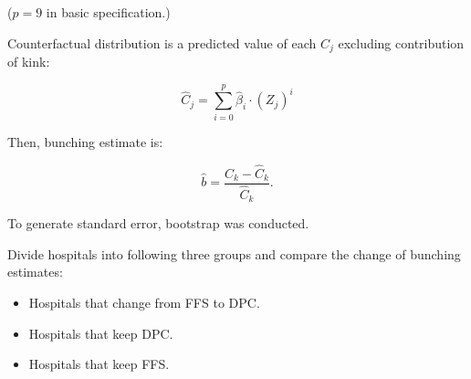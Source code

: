 \documentclass[14pt]{beamer}
\begin{document}
\begin{frame}[allowframebreaks]
{($p=9$ in basic specification.)
}

\framebreak

Counterfactual distribution is a predicted value of each $C_j$ excluding contribution of kink:

\begin{equation}
{\hat C_j}=\sum_{i=0}^p {\hat \beta_{i}}\cdot(Z_j)^i
\end{equation}

Then, bunching estimate is:

\begin{equation}
{\hat b}=\frac{C_k-{\hat C_k}}{{\hat C_k}}.
\end{equation}

To generate standard error, bootstrap was conducted.

\framebreak

Divide hospitals into following three groups and compare the change of bunching estimates:
\begin{itemize}
\item Hospitals that change from FFS to DPC.
\item Hospitals that keep DPC.
\item Hospitals that keep FFS.
\end{itemize}

\end{frame}
\end{document}
